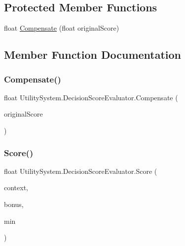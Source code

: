 \subsection*{Protected Member Functions}
\begin{DoxyCompactItemize}
\item 
float \mbox{\hyperlink{class_utility_system_1_1_decision_score_evaluator_aefe0da6966b6e9fa0fad36de6c70add7}{Compensate}} (float original\+Score)
\end{DoxyCompactItemize}


\subsection{Member Function Documentation}
\mbox{\label{class_utility_system_1_1_decision_score_evaluator_aefe0da6966b6e9fa0fad36de6c70add7}} 
\subsubsection{\texorpdfstring{Compensate()}{Compensate()}}
{\footnotesize\ttfamily float Utility\+System.\+Decision\+Score\+Evaluator.\+Compensate (\begin{DoxyParamCaption}\item[{float}]{original\+Score }\end{DoxyParamCaption})\hspace{0.3cm}{\ttfamily [protected]}}

\mbox{\label{class_utility_system_1_1_decision_score_evaluator_acf7ab6dfc85d63f780e632430a3cc991}} 
\subsubsection{\texorpdfstring{Score()}{Score()}}
{\footnotesize\ttfamily float Utility\+System.\+Decision\+Score\+Evaluator.\+Score (\begin{DoxyParamCaption}\item[{\mbox{\hyperlink{class_utility_system_1_1_decision_context}{Decision\+Context}}}]{context,  }\item[{float}]{bonus,  }\item[{float}]{min }\end{DoxyParamCaption})}



